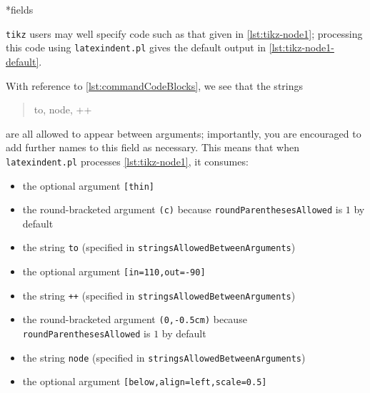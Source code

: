 *{fields}
 \begin{example}
 \texttt{tikz} users may well specify code such as that given in
 \cref{lst:tikz-node1}; processing this code using
 \texttt{latexindent.pl} gives the default output in \cref{lst:tikz-node1-default}.

 \begin{cmhtcbraster}
 \end{cmhtcbraster}

 With reference to \vref{lst:commandCodeBlocks}, we see that the strings
 \begin{quote}
  to, node, ++
 \end{quote}
 are all allowed to appear between arguments; importantly, you are encouraged to add
 further names to this field as necessary. This means that when \texttt{latexindent.pl}
 processes \cref{lst:tikz-node1}, it consumes:
 \begin{itemize}
  \item the optional argument \lstinline![thin]!
  \item the round-bracketed argument \lstinline!(c)! because \texttt{roundParenthesesAllowed} is
        $1$ by default
  \item the string \lstinline!to! (specified in \texttt{stringsAllowedBetweenArguments})
  \item the optional argument \lstinline![in=110,out=-90]!
  \item the string \lstinline!++! (specified in \texttt{stringsAllowedBetweenArguments})
  \item the round-bracketed argument \lstinline!(0,-0.5cm)! because
        \texttt{roundParenthesesAllowed} is $1$ by default
  \item the string \lstinline!node! (specified in \texttt{stringsAllowedBetweenArguments})
  \item the optional argument \lstinline![below,align=left,scale=0.5]!
 \end{itemize}
 \end{example}

